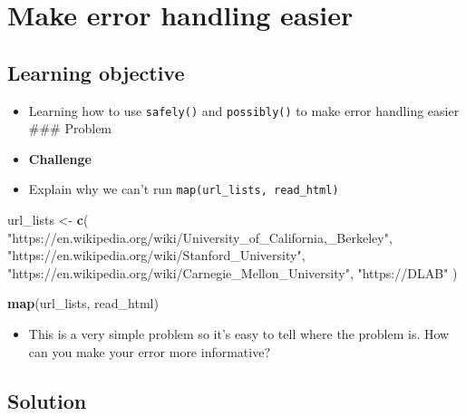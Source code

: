 \documentclass[
]{book}
\newenvironment{Shaded}{\begin{snugshade}}{\end{snugshade}}
\newcommand{\KeywordTok}[1]{\textcolor[rgb]{0.13,0.29,0.53}{\textbf{#1}}}
\newcommand{\NormalTok}[1]{#1}
\newcommand{\StringTok}[1]{\textcolor[rgb]{0.31,0.60,0.02}{#1}}
\providecommand{\tightlist}{%
  \setlength{\itemsep}{0pt}\setlength{\parskip}{0pt}}
\begin{document}
\hypertarget{make-error-handling-easier}{%
\section{Make error handling easier}\label{make-error-handling-easier}}

\hypertarget{learning-objective}{%
\subsection{Learning objective}\label{learning-objective}}

\begin{itemize}
\item
  Learning how to use \texttt{safely()} and \texttt{possibly()} to make error handling easier
  \#\#\# Problem
\item
  \textbf{Challenge}
\item
  Explain why we can't run \texttt{map(url\_lists,\ read\_html)}
\end{itemize}

\begin{Shaded}
\begin{Highlighting}[]
\NormalTok{url\_lists \textless{}{-}}\StringTok{ }\KeywordTok{c}\NormalTok{(}
  \StringTok{"https://en.wikipedia.org/wiki/University\_of\_California,\_Berkeley"}\NormalTok{,}
  \StringTok{"https://en.wikipedia.org/wiki/Stanford\_University"}\NormalTok{,}
  \StringTok{"https://en.wikipedia.org/wiki/Carnegie\_Mellon\_University"}\NormalTok{,}
  \StringTok{"https://DLAB"}
\NormalTok{)}
\end{Highlighting}
\end{Shaded}

\begin{Shaded}
\begin{Highlighting}[]
\KeywordTok{map}\NormalTok{(url\_lists, read\_html)}
\end{Highlighting}
\end{Shaded}

\begin{itemize}
\tightlist
\item
  This is a very simple problem so it's easy to tell where the problem is. How can you make your error more informative?
\end{itemize}

\hypertarget{solution-1}{%
\subsection{Solution}\label{solution-1}}
\end{document}
